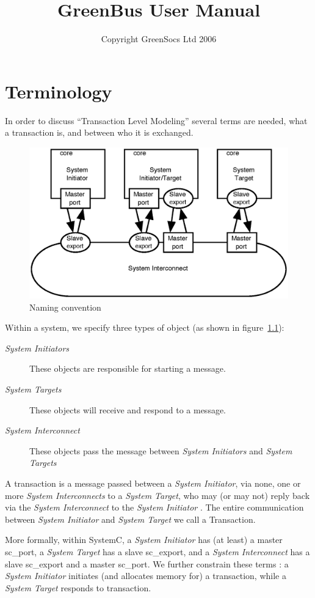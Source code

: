 \documentclass[12pt,oneside]{gsbook}
\author{Copyright GreenSocs Ltd 2006}
\title{GreenBus User Manual}
\newcommand{\master}{{\em System Initiator}\xspace}
\newcommand{\masters}{{\em System Initiators}\xspace}
\newcommand{\slave}{{\em System Target}\xspace}
\newcommand{\slaves}{{\em System Targets}\xspace}
\newcommand{\router}{{\em System Interconnect}\xspace}
\newcommand{\routers}{{\em System Interconnects}\xspace}
\begin{document}
\maketitle
\tableofcontents


\chapter{Terminology}
\label{TERMS}
In order to discuss ``Transaction Level Modeling'' several terms are
needed,  what a transaction is, and between who it is
exchanged.

\begin{figure}[htbp]
        \centering
        \includegraphics{names.eps}
        \caption{Naming convention}
        \label{fig:naming}
\end{figure}


Within a system, we specify three types of object (as shown in figure~\ref{fig:naming}):
\begin{description}
\item [\masters] These objects are responsible for starting a
message.
\item [\slaves] These objects will receive and respond to a
message.
\item [\router] These objects pass the message between
\masters and \slaves
\end{description}

A transaction is a message passed between a \master, via
none, one or more \routers to a \slave, who may (or
may not) reply back via the \router to the \master
. The entire communication between \master and
\slave we call a Transaction.

More formally, within SystemC, a \master has (at least) a master
sc\_port, a \slave has a slave sc\_export, and a \router
has a slave sc\_export and a master sc\_port. We further constrain
these terms : a \master initiates (and allocates memory for) a
transaction, while a \slave responds to transaction. 
\end{document}
